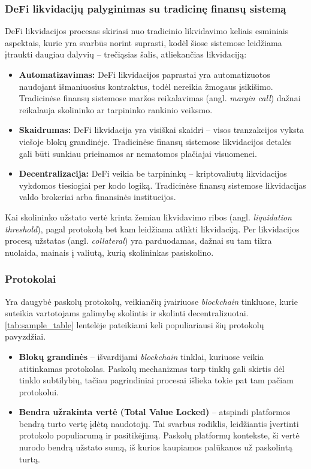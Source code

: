 \documentclass[]{VUMIFTemplateClass}
\begin{document}
\subsubsection{DeFi likvidacijų palyginimas su tradicinę finansų sistemą}
DeFi likvidacijos procesas skiriasi nuo tradicinio likvidavimo keliais esminiais aspektais, kurie yra svarbūs norint suprasti, kodėl šiose sistemose leidžiama įtraukti daugiau dalyvių – trečiąsias šalis, atliekančias likvidaciją\cite{whatisdefiliquidation}:

\begin{itemize}
    \item \textbf{Automatizavimas:} DeFi likvidacijos paprastai yra automatizuotos naudojant išmaniuosius kontraktus, todėl nereikia žmogaus įsikišimo. Tradicinėse finansų sistemose maržos reikalavimas (angl. \textit{margin call}) dažnai reikalauja skolininko ar tarpininko rankinio veiksmo.
    
    \item \textbf{Skaidrumas:} DeFi likvidacija yra visiškai skaidri – visos tranzakcijos vyksta viešoje blokų grandinėje. Tradicinėse finansų sistemose likvidacijos detalės gali būti sunkiau prieinamos ar nematomos plačiajai visuomenei.
    
    \item \textbf{Decentralizacija:} DeFi veikia be tarpininkų – kriptovaliutų likvidacijos vykdomos tiesiogiai per kodo logiką. Tradicinėse finansų sistemose likvidacijas valdo brokeriai arba finansinės institucijos.
\end{itemize}

Kai skolininko užstato vertė krinta žemiau likvidavimo ribos (angl. \textit{liquidation threshold}), pagal protokolą bet kam leidžiama atlikti likvidaciją. Per likvidacijos procesą užstatas (angl. \textit{collateral}) yra parduodamas, dažnai su tam tikra nuolaida, mainais į valiutą, kurią skolininkas pasiskolino. \cite{venusliquidations}

\subsubsection{Protokolai}

Yra daugybė paskolų protokolų, veikiančių įvairiuose \textit{blockchain} tinkluose, kurie suteikia vartotojams galimybę skolintis ir skolinti decentralizuotai. \ref{tab:sample_table} lentelėje pateikiami keli populiariausi šių protokolų pavyzdžiai. 

\begin{itemize}
  \item \textbf{Blokų grandinės} – išvardijami \textit{blockchain} tinklai, kuriuose veikia atitinkamas protokolas. Paskolų mechanizmas tarp tinklų gali skirtis dėl tinklo subtilybių, tačiau pagrindiniai procesai išlieka tokie pat tam pačiam protokolui.
  \item \textbf{Bendra užrakinta vertė (Total Value Locked)} – atspindi platformos bendrą turto vertę įdėtą naudotojų. Tai svarbus rodiklis, leidžiantis įvertinti protokolo populiarumą ir pasitikėjimą. Paskolų platformų kontekste, ši vertė nurodo bendrą užstato sumą, iš kurios kaupiamos palūkanos už paskolintą turtą.
  \end{itemize}
  
\end{document}
